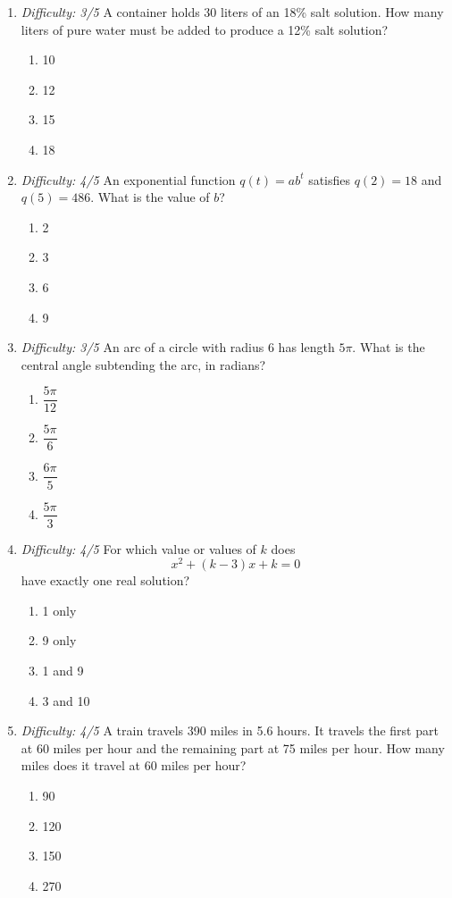 \documentclass[12pt]{article}
\begin{document}
\begin{enumerate}[leftmargin=*,itemsep=1.2em,topsep=0.8em]
  \item \textit{Difficulty: 3/5} A container holds 30 liters of an 18\% salt solution. How many liters of pure water must be added to produce a 12\% salt solution?
  \begin{enumerate}[label=\Alph*.,itemsep=0pt]
    \item 10 \item 12 \item 15 \item 18
  \end{enumerate}

  \item \textit{Difficulty: 4/5} An exponential function $q(t)=ab^t$ satisfies $q(2)=18$ and $q(5)=486$. What is the value of $b$?
  \begin{enumerate}[label=\Alph*.,itemsep=0pt]
    \item 2 \item 3 \item 6 \item 9
  \end{enumerate}

  \item \textit{Difficulty: 3/5} An arc of a circle with radius 6 has length $5\pi$. What is the central angle subtending the arc, in radians?
  \begin{enumerate}[label=\Alph*.,itemsep=0pt]
    \item $\dfrac{5\pi}{12}$ \item $\dfrac{5\pi}{6}$
    \item $\dfrac{6\pi}{5}$ \item $\dfrac{5\pi}{3}$
  \end{enumerate}

  \item \textit{Difficulty: 4/5} For which value or values of $k$ does
  \[
    x^2+(k-3)x+k=0
  \]
  have exactly one real solution?
  \begin{enumerate}[label=\Alph*.,itemsep=0pt]
    \item 1 only \item 9 only \item 1 and 9 \item 3 and 10
  \end{enumerate}

  \item \textit{Difficulty: 4/5} A train travels 390 miles in 5.6 hours. It travels the first part at 60 miles per hour and the remaining part at 75 miles per hour. How many miles does it travel at 60 miles per hour?
  \begin{enumerate}[label=\Alph*.,itemsep=0pt]
    \item 90 \item 120 \item 150 \item 270
  \end{enumerate}


\end{enumerate}
\end{document}
